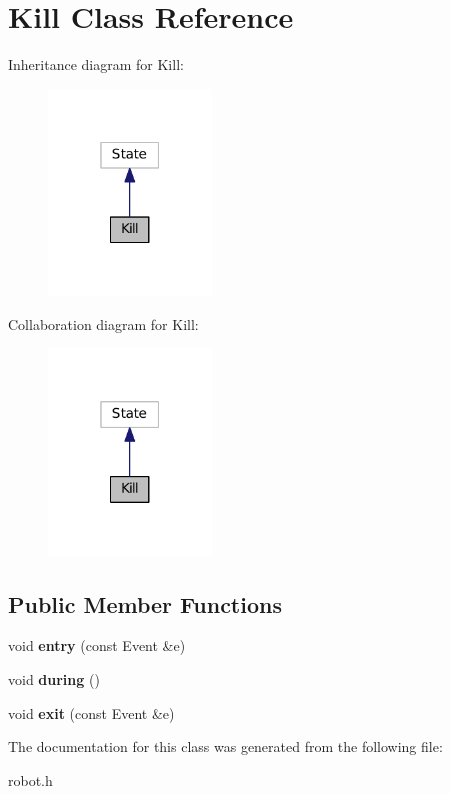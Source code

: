 \hypertarget{classKill}{\section{Kill Class Reference}
\label{classKill}
}


Inheritance diagram for Kill\+:
\nopagebreak
\begin{figure}[H]
\begin{center}
\leavevmode
\includegraphics[width=123pt]{classKill__inherit__graph}
\end{center}
\end{figure}


Collaboration diagram for Kill\+:
\nopagebreak
\begin{figure}[H]
\begin{center}
\leavevmode
\includegraphics[width=123pt]{classKill__coll__graph}
\end{center}
\end{figure}
\subsection*{Public Member Functions}
\begin{DoxyCompactItemize}
\item 
\hypertarget{classKill_a6f43009a892f30e16cb252c4ddf9d09f}{void {\bfseries entry} (const Event \&e)}\label{classKill_a6f43009a892f30e16cb252c4ddf9d09f}

\item 
\hypertarget{classKill_ac810d887bcc6fe8ef7f1b7ad5cfafffe}{void {\bfseries during} ()}\label{classKill_ac810d887bcc6fe8ef7f1b7ad5cfafffe}

\item 
\hypertarget{classKill_af198d4b7cf0554046d7f5f4687603c72}{void {\bfseries exit} (const Event \&e)}\label{classKill_af198d4b7cf0554046d7f5f4687603c72}

\end{DoxyCompactItemize}


The documentation for this class was generated from the following file\+:\begin{DoxyCompactItemize}
\item 
robot.\+h\end{DoxyCompactItemize}
